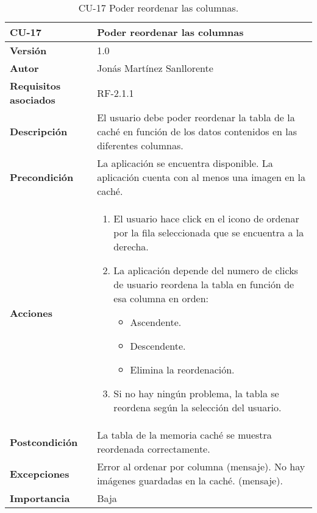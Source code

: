 \begin{table}[p]
	\centering
	\begin{tabularx}{\linewidth}{ p{} p{} }
		\toprule
		\textbf{CU-17}    & \textbf{Poder reordenar las columnas}\\
		\toprule
		\textbf{Versión}              & 1.0    \\
		\textbf{Autor}                & Jonás Martínez Sanllorente \\
		\textbf{Requisitos asociados} & RF-2.1.1 \\
		\textbf{Descripción}          & El usuario debe poder reordenar la tabla de la caché en función de los datos contenidos en las diferentes columnas. \\
		\textbf{Precondición}         & La aplicación se encuentra disponible.\newline
                                        La aplicación cuenta con al menos una imagen en la caché. \\
		\textbf{Acciones}             &
		\begin{enumerate}
			\def\labelenumi{\arabic{enumi}.}
			\tightlist
			\item El usuario hace click en el icono de ordenar por la fila seleccionada que se encuentra a la derecha.
            \item La aplicación depende del numero de clicks de usuario reordena la tabla en función de esa columna en orden:
            \begin{itemize}
                \item Ascendente.
                \item Descendente.
                \item Elimina la reordenación.
            \end{itemize}
			\item Si no hay ningún problema, la tabla se reordena según la selección del usuario.
		\end{enumerate}\\
		\textbf{Postcondición}        & La tabla de la memoria caché se muestra reordenada correctamente. \\
		\textbf{Excepciones}          & Error al ordenar por columna (mensaje).\newline
                                        No hay imágenes guardadas en la caché. (mensaje).\\
		\textbf{Importancia}          & Baja \\
		\bottomrule
	\end{tabularx}
	\caption{CU-17 Poder reordenar las columnas.}
\end{table}

